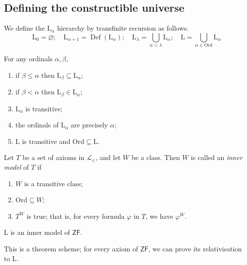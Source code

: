 \subsection{Defining the constructible universe}
We define the \( \mathrm{L}_\alpha \) hierarchy by transfinite recursion as follows.
\[ \mathrm{L}_0 = \varnothing;\quad \mathrm{L}_{\alpha + 1} = \operatorname{Def}(\mathrm{L}_\alpha);\quad \mathrm{L}_\lambda = \bigcup_{\alpha < \lambda} \mathrm{L}_\alpha;\quad \mathrm{L} = \bigcup_{\alpha \in \mathrm{Ord}} \mathrm{L}_\alpha \]
\begin{lemma}
    For any ordinals \( \alpha, \beta \),
    \begin{enumerate}
        \item if \( \beta \leq \alpha \) then \( \mathrm{L}_\beta \subseteq \mathrm{L}_\alpha \);
        \item if \( \beta < \alpha \) then \( \mathrm{L}_\beta \in \mathrm{L}_\alpha \);
        \item \( \mathrm{L}_\alpha \) is transitive;
        \item the ordinals of \( \mathrm{L}_\alpha \) are precisely \( \alpha \);
        \item \( \mathrm{L} \) is transitive and \( \mathrm{Ord} \subseteq \mathrm{L} \).
    \end{enumerate}
\end{lemma}
\begin{definition}
    Let \( T \) be a set of axioms in \( \mathcal L_\in \), and let \( W \) be a class.
    Then \( W \) is called an \emph{inner model} of \( T \) if
    \begin{enumerate}
        \item \( W \) is a transitive class;
        \item \( \mathrm{Ord} \subseteq W \);
        \item \( T^W \) is true; that is, for every formula \( \varphi \) in \( T \), we have \( \varphi^W \).
    \end{enumerate}
\end{definition}
\begin{theorem}
    \( \mathrm{L} \) is an inner model of \( \mathsf{ZF} \).
\end{theorem}
This is a theorem scheme; for every axiom of \( \mathsf{ZF} \), we can prove its relativisation to \( \mathrm{L} \).
